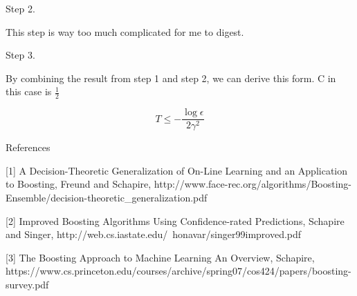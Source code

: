 \documentclass[11pt]{article}
\theoremstyle{definition}
\begin{document}
Step 2.

This step is way too much complicated for me to digest.

Step 3.

By combining the result from step 1 and step 2, we can derive this form.
C in this case is $\frac{1}{2}$

\begin{equation*}
T \le - \frac {\log \epsilon}{2\gamma^2}
\end{equation*}

\bigskip
References

[1] A Decision-Theoretic Generalization of On-Line Learning and an Application to Boosting, Freund and Schapire, 
http://www.face-rec.org/algorithms/Boosting-Ensemble/decision-theoretic_generalization.pdf

[2] Improved Boosting Algorithms
Using Confidence-rated Predictions, Schapire and Singer, http://web.cs.iastate.edu/~honavar/singer99improved.pdf

[3] The Boosting Approach to Machine Learning An Overview, Schapire, https://www.cs.princeton.edu/courses/archive/spring07/cos424/papers/boosting-survey.pdf
\end{document}
